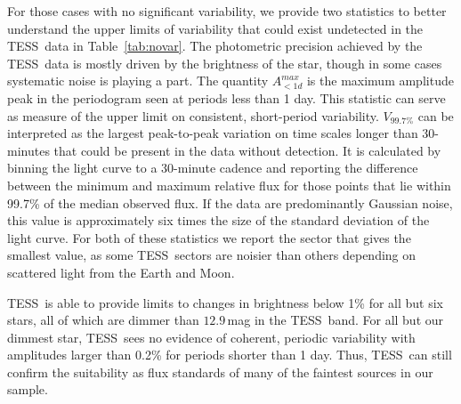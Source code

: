 \documentclass[twocolumn]{aastex631}
\newcommand{\tess}{TESS}
\begin{document}
For those cases with no significant variability, we provide two statistics to better understand the upper limits of variability that could exist undetected in the \tess\ data in Table~\ref{tab:novar}. The photometric precision achieved by the \tess\ data is mostly driven by the brightness of the star, though in some cases systematic noise is playing a part. The quantity $A^{max}_{<1d}$ is the maximum amplitude peak in the periodogram seen at periods less than 1 day. This statistic can serve as measure of the upper limit on consistent, short-period variability. $V_{99.7\%}$ can be interpreted as the largest peak-to-peak variation on time scales longer than 30-minutes that could be present in the data without detection. It is calculated by binning the light curve to a 30-minute cadence and reporting the difference between the minimum and maximum relative flux for those points that lie within 99.7\% of the median observed flux. If the data are predominantly Gaussian noise, this value is approximately six times the size of the standard deviation of the light curve. For both of these statistics we report the sector that gives the smallest value, as some \tess\ sectors are noisier than others depending on scattered light from the Earth and Moon. 

\tess\ is able to provide limits to changes in brightness below 1\% for all but six stars, all of which are dimmer than $12.9$\,mag in the \tess\ band.  For all but our dimmest star, \tess\ sees no evidence of coherent, periodic variability with amplitudes larger than 0.2\% for periods shorter than 1 day. Thus, \tess\ can still confirm the suitability as flux standards of many of the faintest sources in our sample.


\vspace{-1em}
\end{document}
